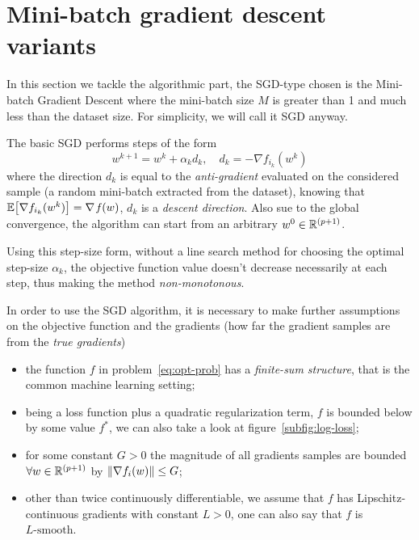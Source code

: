 \section{Mini-batch gradient descent variants}

In this section we tackle the algorithmic part, the SGD-type chosen is the Mini-batch Gradient Descent where the mini-batch size $M$ is greater than 1 and much less than the dataset size. For simplicity, we will call it SGD anyway.

The basic SGD performs steps of the form
\begin{equation}\label{eq:sgd_step}
w^{k+1}=w^k+\alpha_kd_k,\quad d_k=-\nabla f_{i_k}(w^k)
\end{equation}
where the direction $d_k$ is equal to the \emph{anti-gradient} evaluated on the considered sample (a random mini-batch extracted from the dataset), knowing that $\mathbb{E}\bigl[\nabla f_{i_k}(w^k)\bigr]=\nabla\operatorname*{\mathit{f}}(w)$, $d_k$ is a \emph{descent direction}. Also sue to the global convergence, the algorithm can start from an arbitrary $w^0\in\mathbb{R}^{(p+1)}$.

Using this step-size form, without a line search method for choosing the optimal step-size $\alpha_k$, the objective function value doesn't decrease necessarily at each step, thus making the method \emph{non-monotonous}.

In order to use the SGD algorithm, it is necessary to make further assumptions on the objective function and the gradients (how far the gradient samples are from the \emph{true gradients})
\begin{itemize}
\item the function $f$ in problem~\eqref{eq:opt-prob} has a \emph{finite-sum structure}, that is the common machine learning setting;
\item being a loss function plus a quadratic regularization term, $f$ is bounded below by some value $f^\ast$, we can also take a look at figure~\ref{subfig:log-loss};
\item for some constant $G>0$ the magnitude of all gradients samples are bounded $\forall w\in\mathbb{R}^{(p+1)}$ by $\lVert\nabla f_i(w)\rVert\leq G$;
\item other than twice continuously differentiable, we assume that $f$ has Lipschitz-continuous gradients with constant $L>0$, one can also say that $f$ is $L\text{-smooth}$.
\end{itemize}

